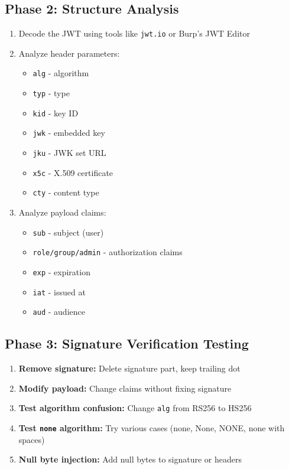 \documentclass{article}
\begin{document}
\subsection{Phase 2: Structure Analysis}

\begin{methodologybox}
\begin{enumerate}
    \item Decode the JWT using tools like \texttt{jwt.io} or Burp's JWT Editor
    \item Analyze header parameters:
    \begin{itemize}
        \item \texttt{alg} - algorithm
        \item \texttt{typ} - type
        \item \texttt{kid} - key ID
        \item \texttt{jwk} - embedded key
        \item \texttt{jku} - JWK set URL
        \item \texttt{x5c} - X.509 certificate
        \item \texttt{cty} - content type
    \end{itemize}
    \item Analyze payload claims:
    \begin{itemize}
        \item \texttt{sub} - subject (user)
        \item \texttt{role/group/admin} - authorization claims
        \item \texttt{exp} - expiration
        \item \texttt{iat} - issued at
        \item \texttt{aud} - audience
    \end{itemize}
\end{enumerate}
\end{methodologybox}

\subsection{Phase 3: Signature Verification Testing}

\begin{methodologybox}
\begin{enumerate}
    \item \textbf{Remove signature:} Delete signature part, keep trailing dot
    \item \textbf{Modify payload:} Change claims without fixing signature
    \item \textbf{Test algorithm confusion:} Change \texttt{alg} from RS256 to HS256
    \item \textbf{Test \texttt{none} algorithm:} Try various cases (none, None, NONE, none with spaces)
    \item \textbf{Null byte injection:} Add null bytes to signature or headers
\end{enumerate}
\end{methodologybox}
\end{document}
